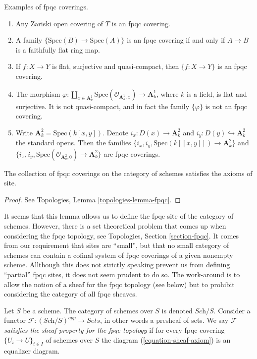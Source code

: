 \begin{example}
\label{example-fpqc-coverings}
Examples of fpqc coverings.
\begin{enumerate}
\item Any Zariski open covering of $T$ is an fpqc covering.
\item A family $\{\text{Spec}(B) \to \text{Spec}(A)\}$ is an fpqc
covering if and only if $A \to B$ is a faithfully flat ring map.
\item If $f: X \to Y$ is flat, surjective and quasi-compact, then $\{ f: X\to
Y\}$ is an fpqc covering.
\item The morphism
$\varphi :
\coprod_{x \in \mathbf{A}^1_k} \text{Spec}(\mathcal{O}_{\mathbf{A}^1_k,x})
\to \mathbf{A}^1_k$,
where $k$ is a field, is flat and surjective. It is not quasi-compact, and
in fact the family $\{\varphi\}$ is not an fpqc covering.
\item Write
$\mathbf{A}^2_k = \text{Spec}(k[x,y])$. Denote $i_x : D(x) \to \mathbf{A}^2_k$
and $i_y : D(y) \hookrightarrow \mathbf{A}^2_k$ the standard opens.
Then the families
$\{i_x, i_y, \text{Spec}(k[[x,y]]) \to \mathbf{A}^2_k\}$
and
$\{i_x, i_y, \text{Spec}(\mathcal{O}_{\mathbf{A}^2_k,0}) \to \mathbf{A}^2_k\}$
are fpqc coverings.
\end{enumerate}
\end{example}

\begin{lemma}
\label{lemma-site-fpqc}
The collection of fpqc coverings on the category of schemes
satisfies the axioms of site.
\end{lemma}

\begin{proof}
See Topologies, Lemma \ref{topologies-lemma-fpqc}.
\end{proof}

\noindent
It seems that this lemma allows us to define the fpqc site of the category
of schemes. However, there is a set theoretical problem that comes up when
considering the fpqc topology, see
Topologies, Section \ref{section-fpqc}.
It comes from our requirement that sites are ``small'', but that no small
category of schemes can contain a cofinal system of fpqc coverings of a
given nonempty scheme. Allthough this does not strictly speaking prevent
us from defining  ``partial'' fpqc
sites, it does not seem prudent to do so. The work-around is to allow
the notion of a sheaf for the fpqc topology (see below) but to prohibit
considering the category of all fpqc sheaves.

\begin{definition}
\label{definition-sheaf-property-fpqc}
Let $S$ be a scheme. The category of schemes over $S$ is denoted
$\textit{Sch}/S$. Consider a functor
$\mathcal{F} : (\textit{Sch}/S)^{opp} \to \textit{Sets}$, in other words
a presheaf of sets. We say $\mathcal{F}$
{\it satisfies the sheaf property for the fpqc topology}
if for every fpqc covering $\{U_i \to U\}_{i \in I}$ of schemes over $S$
the diagram (\ref{equation-sheaf-axiom}) is an equalizer diagram.
\end{definition}

